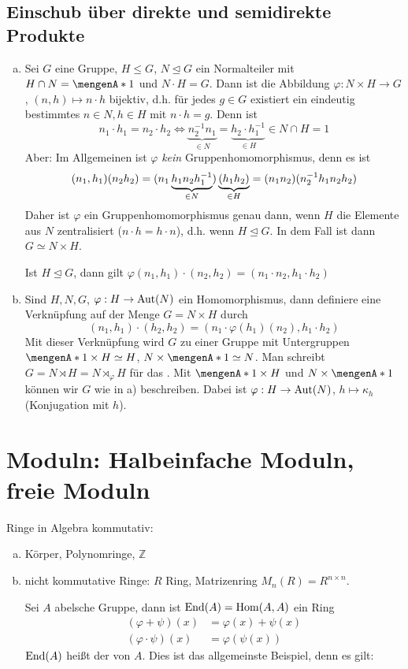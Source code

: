 \subsection{Einschub über direkte und semidirekte Produkte} %
\label{sub:129}
\begin{enumerate}[a)]
	\item Sei $G$ eine Gruppe, $H \le G$, $N \unlhd G$ ein Normalteiler mit $H \cap N = \set{1}$ und $N \cdot H = G$. Dann ist die Abbildung $\varphi : N \times H \to G$,
	$(n,h) \mapsto n \cdot h$ bijektiv, d.h. für jedes $g \in G$ existiert ein eindeutig bestimmtes $n \in N, h \in H$ mit $n \cdot h = g$.
	Denn ist 
	\[
		n_1 \cdot h_1 = n_2 \cdot h_2 \iff \underbrace{n_2 ^{-1} n_1}_{\in N} = \underbrace{h_2 \cdot h_1 ^{-1}}_{\in H} \in N \cap H = 1
	\]
	Aber: Im Allgemeinen ist $\varphi$ \emph{kein} Gruppenhomomorphismus, denn es ist 
	\[
		(n_1, h_1) (n_2 h_2) = (n_1 \underbrace{h_1 n_2 h_1 ^{-1}}_{\in N}) \underbrace{(h_1 h_2)}_{\in H} = (n_1 n_2) (n_2 ^{-1} h_1 n_2 h_2)
	\]
	Daher ist $\varphi$ ein Gruppenhomomorphismus genau dann, wenn $H$ die Elemente aus $N$ zentralisiert ($n \cdot h = h \cdot n$),
	 d.h. wenn $H\unlhd G$. In dem Fall ist dann $G\simeq N \times H$. 
	
	Ist $H \unlhd G$, dann gilt $\varphi(n_1, h_1) \cdot (n_2, h_2) = (n_1 \cdot n_2, h_1 \cdot h_2)$
	\item Sind $H,N, G$, $\varphi : H \to \operatorname{Aut}(N)$ ein Homomorphismus, dann definiere eine Verknüpfung auf der Menge $G = N \times H$ durch
	\[
		(n_1, h_1) \cdot (h_2, h_2) = (n_1 \cdot \varphi(h_1) (n_2), h_1 \cdot h_2)
	\]
	Mit dieser Verknüpfung wird $G$ zu einer Gruppe mit Untergruppen $\set{1} \times H \simeq H $, $N \times \set{1} \simeq N $. Man schreibt 
	$G = N \rtimes H = N \rtimes_\varphi H$ für das . Mit $\set{1} \times H $ und $N \times \set{1} $ können wir $G$ 
	wie in a) beschreiben. Dabei ist $\varphi : H \to \operatorname{Aut}(N)$, $h \mapsto \kappa_h$ (Konjugation mit $h$).
\end{enumerate}
\newpage

\section{Moduln: Halbeinfache Moduln, freie Moduln} %
\label{sec:2}

Ringe in Algebra  kommutativ:
\begin{enumerate}[a)]
	\item Körper, Polynomringe, $\mathds{Z}$
	\item nicht kommutative Ringe: $R$ Ring, Matrizenring $M_n(R)= R^{n \times n}$. 
	
	Sei $A$ abelsche Gruppe, dann ist $\operatorname{End}(A) = \operatorname{Hom}(A,A)$ ein Ring 
	\begin{align*}
		(\varphi + \psi)(x) &= \varphi(x) + \psi(x) \\
		(\varphi \cdot \psi)(x) &= \varphi(\psi(x))
	\end{align*}
	$\operatorname{End}(A)$ heißt der  von $A$. Dies ist das allgemeinste Beispiel, denn es gilt:
\end{enumerate}

